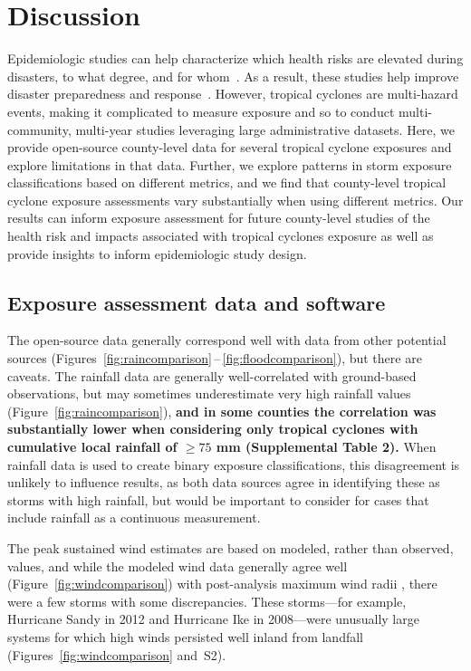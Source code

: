 \section*{Discussion}

Epidemiologic studies can help characterize which health risks are elevated
during disasters, to what degree, and for
whom~\parencite{ibrahim2005unfortunate, noji2005disasters}.  As a result, these
studies help improve disaster preparedness and
response~\parencite{noji2005disasters}.  However, tropical cyclones are
multi-hazard events, making it complicated to measure exposure and so to
conduct multi-community, multi-year studies leveraging large administrative
datasets.  Here, we provide open-source county-level data for several tropical
cyclone exposures and explore limitations in that data.  
Further, we explore patterns in storm exposure classifications based on
different metrics, and we find that county-level tropical cyclone exposure
assessments vary substantially when using different metrics.
Our results can inform exposure assessment for future county-level studies of
the health risk and impacts associated with tropical cyclones exposure as
well as provide insights to inform epidemiologic study design.  

\subsection*{Exposure assessment data and software}

The open-source data generally correspond well with data from other potential
sources (Figures~\ref{fig:raincomparison}\,--\,\ref{fig:floodcomparison}), but
there are caveats. The rainfall data are generally well-correlated with
ground-based observations, but may sometimes underestimate very high rainfall
values (Figure~\ref{fig:raincomparison}), \textbf{and in some counties the
correlation was substantially lower when considering only tropical cyclones
with cumulative local rainfall of $\ge75$ mm (Supplemental Table 2).} When
rainfall data is used to create binary exposure classifications, this
disagreement is unlikely to influence results, as both data sources agree in
identifying these as storms with high rainfall, but would be important to
consider for cases that include rainfall as a continuous measurement. 

The peak sustained wind estimates are based on modeled, rather than observed,
values, and while the modeled wind data generally agree well
(Figure~\ref{fig:windcomparison}) with post-analysis maximum wind radii
\parencite{landsea2013}, there were a few storms with some discrepancies. These
storms---for example, Hurricane Sandy in 2012 and Hurricane Ike in 2008---were
unusually large systems for which high winds persisted well inland from
landfall (Figures~\ref{fig:windcomparison} and~S2). 

